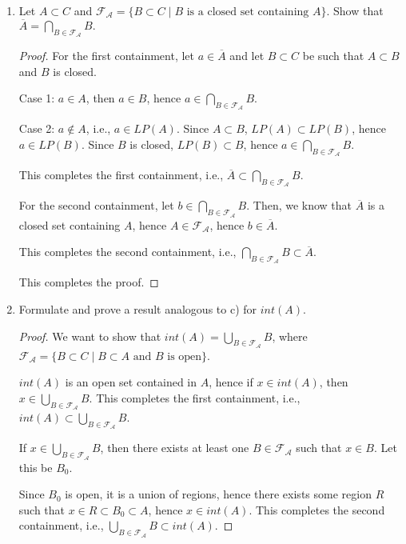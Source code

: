 \documentclass[11pt]{article}
\renewcommand{\_}[1]{\underline{ #1 }}
\theoremstyle{definition}
\numberwithin{equation}{subsection}
\begin{document}
\begin{enumerate}
\begin{enumerate}
\begin{proof}
Then, for every $a \in A$, there exists a region $R \subset B$ such that $a \in R$.

Hence, $A \subset int(B)$.

\renewcommand\qedsymbol{QED}
\end{proof}
\item Let $A\subset C$ and $\mathcal{F_A}=\{B \subset C\mid B \text{ is a closed set containing } A\}.$ Show that $\overline{A}=\bigcap_{B\in \mathcal{F_A}}   B.$
\begin{proof}
For the first containment, let $a \in \overline{A}$ and let $B \subset C$ be such that $A \subset B$ and $B$ is closed.

Case 1: $a \in A$, then $a \in B$, hence $a \in \bigcap_{B\in \mathcal{F_A}}   B$.

Case 2: $a \notin A$, i.e., $a \in LP(A)$. Since $A \subset B$, $LP(A) \subset LP(B)$, hence $a \in LP(B)$. Since $B$ is closed, $LP(B) \subset B$, hence $a \in \bigcap_{B\in \mathcal{F_A}}   B$.

This completes the first containment, i.e., $\overline{A} \subset \bigcap_{B\in \mathcal{F_A}}   B$.

For the second containment, let $b \in \bigcap_{B\in \mathcal{F_A}}   B$. Then, we know that $\overline{A}$ is a closed set containing $A$, hence $A \in \mathcal{F_A}$, hence $b \in \overline{A}$. 

This completes the second containment, i.e., $\bigcap_{B\in \mathcal{F_A}}   B \subset \overline{A}$.

This completes the proof.

\renewcommand\qedsymbol{QED}
\end{proof}
\item Formulate and prove a result analogous to c) for $int (A).$ 

\begin{proof}
We want to show that $int(A) = \bigcup_{B\in \mathcal{F_A}}   B$, where $\mathcal{F_A}=\{B \subset C\mid B \subset A \text{ and } B \text{ is open}\}$.

$int(A)$ is an open set contained in $A$, hence if $x \in int(A)$, then $x \in \bigcup_{B\in \mathcal{F_A}}   B$. This completes the first containment, i.e., $int(A) \subset \bigcup_{B\in \mathcal{F_A}}   B$.

If $x \in \bigcup_{B\in \mathcal{F_A}}   B$, then there exists at least one $B \in \mathcal{F_A}$ such that $x \in B$. Let this be $B_0$. 

Since $B_0$ is open, it is a union of regions, hence there exists some region $R$ such that $x \in R \subset B_0 \subset A$, hence $x \in int(A)$. This completes the second containment, i.e., $\bigcup_{B\in \mathcal{F_A}}   B \subset int(A)$.



\end{proof}
\end{enumerate}
\end{enumerate}
\end{document}
